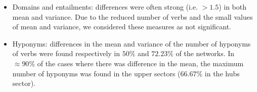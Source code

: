 \begin{itemize}
\begin{itemize}
																																																																																																																																																																																																																																																												\item Domains and entailments:
																																																																																																																																																																																																																																																																differences were often strong (i.e. $>1.5$) in both mean and variance.
																																																																																																																																																																																																																																																																				Due to the reduced number of verbs and the small values of mean and variance,
																																																																																																																																																																																																																																																																								we considered these measures as not significant.
																																																																																																																																																																																																																																																																											\item Hyponyms:
																																																																																																																																																																																																																																																																															differences in the mean and variance of the number of hyponyms of verbs were found respectively in $50\%$ and $72.23\%$ of the networks.
																																																																																																																																																																																																																																																																																			In $\approx 90\%$ of the cases where there was difference in the mean, 
																																																																																																																																																																																																																																																																																							the maximum number of hyponyms was found in the upper sectors ($66.67\%$ in the hubs sector).

\end{itemize}
\end{itemize}
